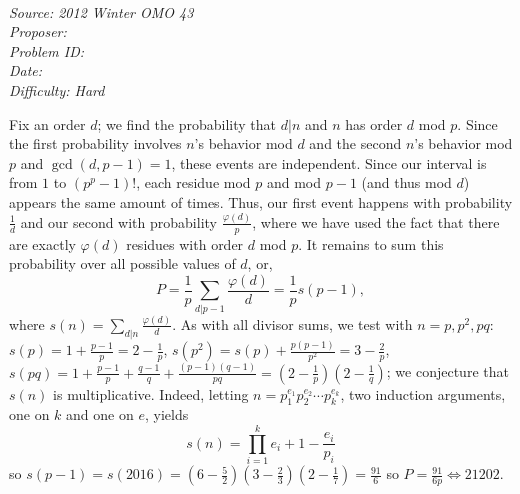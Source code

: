 \SSbreak\\
\emph{Source: 2012 Winter OMO 43}\\
\emph{Proposer: \Paiya}\\ %
\emph{Problem ID:}\\
\emph{Date: }\\
\emph{Difficulty: Hard}\\
\SSbreak

\bigskip

\begin{solution}\hfil\medskip
	
	Fix an order $d$; we find the probability that $d|n$ and $n$ has order $d$ mod $p$. Since the first probability involves $n$'s behavior mod $d$ and the second $n$'s behavior mod $p$ and $\gcd(d, p - 1) = 1$, these events are independent. Since our interval is from $1$ to $\left(p^p - 1\right)!$, each residue mod $p$ and mod $p - 1$ (and thus mod $d$) appears the same amount of times. Thus, our first event happens with probability $\frac{1}{d}$ and our second with probability $\frac{\varphi(d)}{p}$, where we have used the fact that there are exactly $\varphi(d)$ residues with order $d$ mod $p$. It remains to sum this probability over all possible values of $d$, or, $$P = \dfrac{1}{p} \sum_{d|p - 1} \dfrac{\varphi(d)}{d} = \dfrac{1}{p} s(p - 1),$$ where $s(n) = \sum_{d|n} \frac{\varphi(d)}{d}$. As with all divisor sums, we test with $n = p, p^2, pq$: $s(p) = 1 + \frac{p - 1}{p} = 2 - \frac{1}{p}$, $s\left(p^2\right) = s(p) + \frac{p(p - 1)}{p^2} = 3 - \frac{2}{p}$, $s(pq) = 1 + \frac{p - 1}{p} + \frac{q - 1}{q} + \frac{(p - 1)(q - 1)}{pq} = \left(2 - \frac{1}{p}\right)\left(2 - \frac{1}{q}\right)$; we conjecture that $s(n)$ is multiplicative. Indeed, letting $n = p_1^{e_1}p_2^{e_2} \cdots p_k^{e_k}$, two induction arguments, one on $k$ and one on $e$, yields $$s(n) = \prod_{i = 1}^k e_i + 1 - \dfrac{e_i}{p_i}$$ so $s(p - 1) = s(2016) = \left(6 - \frac{5}{2}\right)\left(3 - \frac{2}{3}\right)\left(2 - \frac{1}{7}\right) = \frac{91}{6}$ so $P = \frac{91}{6p} \iff \boxed{21202}$. 
\end{solution}\bigskip
